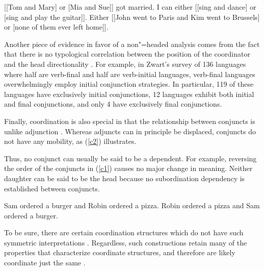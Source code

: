 {\begin{exe}
\ex
\begin{xlista}
\ex {}[[Tom and Mary] or [Mia and Sue]] got married.
\ex I can either [[sing and dance] or [sing and play the guitar]].
\ex Either [[John went to Paris and Kim went to Brussels] or
[none of them ever left home]].
\end{xlista}
\end{exe}

Another piece of evidence in favor of a non"=headed analysis comes from the fact that there is no typological correlation between the position of the coordinator and the head directionality \citep{zwart}. For example, in Zwart's  survey of 136 languages where half are verb-final and half
are verb-initial languages,  verb-final languages overwhelmingly employ initial conjunction strategies.
In particular, 119 of these languages have exclusively initial conjunctions, 12 languages exhibit both initial
and final conjunctions, and only 4 have exclusively final conjunctions. 


Finally, coordination is also special in that the relationship between conjuncts is unlike
adjunction \citep[--160]{levinepostal}.
Whereas adjuncts can in principle be displaced, conjuncts do not have any mobility, as (\ref{c2}) illustrates.

\begin{exe}
\ex
\begin{xlista}
\end{xlista}\label{c2}
\end{exe}


\noindent
Thus, no conjunct can usually be said to be a dependent. For example,  reversing the order of the conjuncts in (\ref{c1}) causes no major change in meaning. Neither daughter can be said to be the head because no subordination dependency is established between conjuncts.

\begin{exe}
\ex
\begin{xlista}
\ex Sam ordered a burger and Robin ordered a pizza.
\ex Robin ordered a pizza and Sam ordered a burger.
\end{xlista}\label{c1}
\end{exe}

\noindent
To be sure, there are certain coordination structures which do not have such symmetric 
interpretations \citep{goldsmith,lakoff86,levinprince86}.
Regardless, such constructions retain many of the properties that characterize coordinate structures, and therefore are likely 
coordinate just the same \citep[Chapter~5]{kehler}.

}
